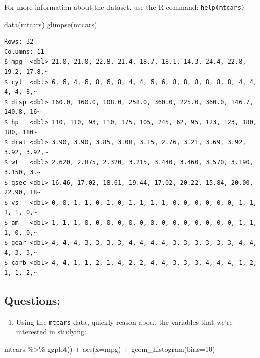 \documentclass[
  letterpaper,
  DIV=11,
  numbers=noendperiod]{scrreprt}
\newenvironment{Shaded}{\begin{snugshade}}{\end{snugshade}}
\newcommand{\AttributeTok}[1]{\textcolor[rgb]{0.40,0.45,0.13}{#1}}
\newcommand{\DecValTok}[1]{\textcolor[rgb]{0.68,0.00,0.00}{#1}}
\newcommand{\FunctionTok}[1]{\textcolor[rgb]{0.28,0.35,0.67}{#1}}
\newcommand{\NormalTok}[1]{\textcolor[rgb]{0.00,0.23,0.31}{#1}}
\newcommand{\SpecialCharTok}[1]{\textcolor[rgb]{0.37,0.37,0.37}{#1}}
\providecommand{\tightlist}{%
  \setlength{\itemsep}{0pt}\setlength{\parskip}{0pt}}\usepackage{longtable,booktabs,array}
\begin{document}
For more information about the dataset, use the R command:
\texttt{help(mtcars)}

\begin{Shaded}
\begin{Highlighting}[]
\FunctionTok{data}\NormalTok{(mtcars)}
\FunctionTok{glimpse}\NormalTok{(mtcars)}
\end{Highlighting}
\end{Shaded}

\begin{verbatim}
Rows: 32
Columns: 11
$ mpg  <dbl> 21.0, 21.0, 22.8, 21.4, 18.7, 18.1, 14.3, 24.4, 22.8, 19.2, 17.8,~
$ cyl  <dbl> 6, 6, 4, 6, 8, 6, 8, 4, 4, 6, 6, 8, 8, 8, 8, 8, 8, 4, 4, 4, 4, 8,~
$ disp <dbl> 160.0, 160.0, 108.0, 258.0, 360.0, 225.0, 360.0, 146.7, 140.8, 16~
$ hp   <dbl> 110, 110, 93, 110, 175, 105, 245, 62, 95, 123, 123, 180, 180, 180~
$ drat <dbl> 3.90, 3.90, 3.85, 3.08, 3.15, 2.76, 3.21, 3.69, 3.92, 3.92, 3.92,~
$ wt   <dbl> 2.620, 2.875, 2.320, 3.215, 3.440, 3.460, 3.570, 3.190, 3.150, 3.~
$ qsec <dbl> 16.46, 17.02, 18.61, 19.44, 17.02, 20.22, 15.84, 20.00, 22.90, 18~
$ vs   <dbl> 0, 0, 1, 1, 0, 1, 0, 1, 1, 1, 1, 0, 0, 0, 0, 0, 0, 1, 1, 1, 1, 0,~
$ am   <dbl> 1, 1, 1, 0, 0, 0, 0, 0, 0, 0, 0, 0, 0, 0, 0, 0, 0, 1, 1, 1, 0, 0,~
$ gear <dbl> 4, 4, 4, 3, 3, 3, 3, 4, 4, 4, 4, 3, 3, 3, 3, 3, 3, 4, 4, 4, 3, 3,~
$ carb <dbl> 4, 4, 1, 1, 2, 1, 4, 2, 2, 4, 4, 3, 3, 3, 4, 4, 4, 1, 2, 1, 1, 2,~
\end{verbatim}

\subsection{Questions:}\label{questions-1}

\begin{enumerate}
\def\labelenumi{\arabic{enumi}.}
\setcounter{enumi}{-1}
\tightlist
\item
  Using the \texttt{mtcars} data, quickly reason about the variables
  that we're interested in studying:
\end{enumerate}

\begin{Shaded}
\begin{Highlighting}[]
\NormalTok{mtcars }\SpecialCharTok{\%\textgreater{}\%} 
  \FunctionTok{ggplot}\NormalTok{() }\SpecialCharTok{+} 
  \FunctionTok{aes}\NormalTok{(}\AttributeTok{x=}\NormalTok{mpg) }\SpecialCharTok{+}
  \FunctionTok{geom\_histogram}\NormalTok{(}\AttributeTok{bins=}\DecValTok{10}\NormalTok{)}
\end{Highlighting}
\end{Shaded}
\end{document}
